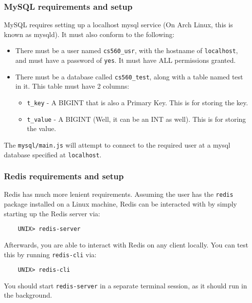 \documentclass[letterpaper, 10 pt, conference]{ieeeconf}
\begin{document}
\subsubsection{ MySQL requirements and setup}
MySQL requires setting up a localhost mysql service (On Arch Linux, this is known as mysqld). It must also conform to the following:
\begin{itemize}
    \item There must be a user named \texttt{cs560\_usr}, with the hostname of \texttt{localhost}, and must have a password of \texttt{yes}. It must have ALL permissions granted.
    \item There must be a database called \texttt{cs560\_test}, along with a table named test in it. This table must have 2 columns:
    \begin{itemize}
        \item \texttt{t\_key} - A BIGINT that is also a Primary Key. This is for storing the key.
        \item \texttt{t\_value} - A BIGINT (Well, it can be an INT as well). This is for storing the value.
    \end{itemize}
\end{itemize}
The \texttt{mysql/main.js} will attempt to connect to the required user at a mysql database specified at \texttt{localhost}.\\
\subsubsection{Redis requirements and setup}
Redis has much more lenient requirements. Assuming the user has the \texttt{redis} package installed on a Linux machine, Redis can be interacted with by simply starting up the Redis server via:
\begin{verbatim}
    UNIX> redis-server
\end{verbatim}
Afterwards, you are able to interact with Redis on any client locally. You can test this by running \texttt{redis-cli} via:
\begin{verbatim}
    UNIX> redis-cli
\end{verbatim}
You should start  \texttt{redis-server} in a separate terminal session, as it should run in the background.\\
\end{document}
